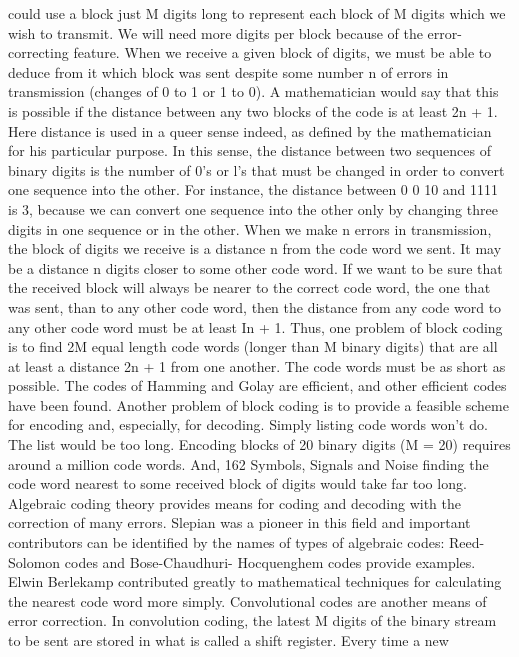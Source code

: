 {{{{{{{{{{could use a block just M digits long to represent each block of M
digits which we wish to transmit. We will need more digits per
block because of the error-correcting feature.
When we receive a given block of digits, we must be able to
deduce from it which block was sent despite some number n of
errors in transmission (changes of 0 to 1 or 1 to 0). A mathematician
would say that this is possible if the distance between any
two blocks of the code is at least 2n + 1.
Here distance is used in a queer sense indeed, as defined by the
mathematician for his particular purpose. In this sense, the distance
between two sequences of binary digits is the number of 0’s
or l’s that must be changed in order to convert one sequence into
the other. For instance, the distance between 0 0 10 and 1111
is 3, because we can convert one sequence into the other only by
changing three digits in one sequence or in the other.
When we make n errors in transmission, the block of digits we
receive is a distance n from the code word we sent. It may be a
distance n digits closer to some other code word. If we want to be
sure that the received block will always be nearer to the correct
code word, the one that was sent, than to any other code word,
then the distance from any code word to any other code word must
be at least In + 1.
Thus, one problem of block coding is to find 2M equal length
code words (longer than M binary digits) that are all at least a
distance 2n + 1 from one another. The code words must be as
short as possible. The codes of Hamming and Golay are efficient,
and other efficient codes have been found.
Another problem of block coding is to provide a feasible scheme
for encoding and, especially, for decoding. Simply listing code
words won’t do. The list would be too long. Encoding blocks of 20
binary digits (M = 20) requires around a million code words. And,
162
Symbols, Signals and Noise
finding the code word nearest to some received block of digits
would take far too long.
Algebraic coding theory provides means for coding and decoding
with the correction of many errors. Slepian was a pioneer in this field
and important contributors can be identified by the names of types
of algebraic codes: Reed-Solomon codes and Bose-Chaudhuri-
Hocquenghem codes provide examples. Elwin Berlekamp contributed
greatly to mathematical techniques for calculating the
nearest code word more simply.
Convolutional codes are another means of error correction. In
convolution coding, the latest M digits of the binary stream to be
sent are stored in what is called a shift register. Every time a new
}}}}}}}}}}
